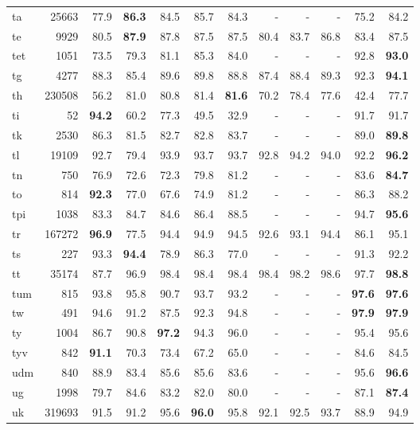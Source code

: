 \documentclass[11pt,a4paper]{article}
\begin{document}
\begin{supertabular}{lrrr|rrr|rrr|rr}
ta & 25663 & 77.9 & \textbf{86.3} & 84.5 & 85.7 & 84.3 & - & - & - & 75.2 & 84.2\\
te & 9929 & 80.5 & \textbf{87.9} & 87.8 & 87.5 & 87.5 & 80.4 & 83.7 & 86.8 & 83.4 & 87.5\\
tet & 1051 & 73.5 & 79.3 & 81.1 & 85.3 & 84.0 & - & - & - & 92.8 & \textbf{93.0}\\
tg & 4277 & 88.3 & 85.4 & 89.6 & 89.8 & 88.8 & 87.4 & 88.4 & 89.3 & 92.3 & \textbf{94.1}\\
th & 230508 & 56.2 & 81.0 & 80.8 & 81.4 & \textbf{81.6} & 70.2 & 78.4 & 77.6 & 42.4 & 77.7\\
ti & 52 & \textbf{94.2} & 60.2 & 77.3 & 49.5 & 32.9 & - & - & - & 91.7 & 91.7\\
tk & 2530 & 86.3 & 81.5 & 82.7 & 82.8 & 83.7 & - & - & - & 89.0 & \textbf{89.8}\\
tl & 19109 & 92.7 & 79.4 & 93.9 & 93.7 & 93.7 & 92.8 & 94.2 & 94.0 & 92.2 & \textbf{96.2}\\
tn & 750 & 76.9 & 72.6 & 72.3 & 79.8 & 81.2 & - & - & - & 83.6 & \textbf{84.7}\\
to & 814 & \textbf{92.3} & 77.0 & 67.6 & 74.9 & 81.2 & - & - & - & 86.3 & 88.2\\
tpi & 1038 & 83.3 & 84.7 & 84.6 & 86.4 & 88.5 & - & - & - & 94.7 & \textbf{95.6}\\
tr & 167272 & \textbf{96.9} & 77.5 & 94.4 & 94.9 & 94.5 & 92.6 & 93.1 & 94.4 & 86.1 & 95.1\\
ts & 227 & 93.3 & \textbf{94.4} & 78.9 & 86.3 & 77.0 & - & - & - & 91.3 & 92.2\\
tt & 35174 & 87.7 & 96.9 & 98.4 & 98.4 & 98.4 & 98.4 & 98.2 & 98.6 & 97.7 & \textbf{98.8}\\
tum & 815 & 93.8 & 95.8 & 90.7 & 93.7 & 93.2 & - & - & - & \textbf{97.6} & \textbf{97.6}\\
tw & 491 & 94.6 & 91.2 & 87.5 & 92.3 & 94.8 & - & - & - & \textbf{97.9} & \textbf{97.9}\\
ty & 1004 & 86.7 & 90.8 & \textbf{97.2} & 94.3 & 96.0 & - & - & - & 95.4 & 95.6\\
tyv & 842 & \textbf{91.1} & 70.3 & 73.4 & 67.2 & 65.0 & - & - & - & 84.6 & 84.5\\
udm & 840 & 88.9 & 83.4 & 85.6 & 85.6 & 83.6 & - & - & - & 95.6 & \textbf{96.6}\\
ug & 1998 & 79.7 & 84.6 & 83.2 & 82.0 & 80.0 & - & - & - & 87.1 & \textbf{87.4}\\
uk & 319693 & 91.5 & 91.2 & 95.6 & \textbf{96.0} & 95.8 & 92.1 & 92.5 & 93.7 & 88.9 & 94.9\\

\end{supertabular}
\end{document}
